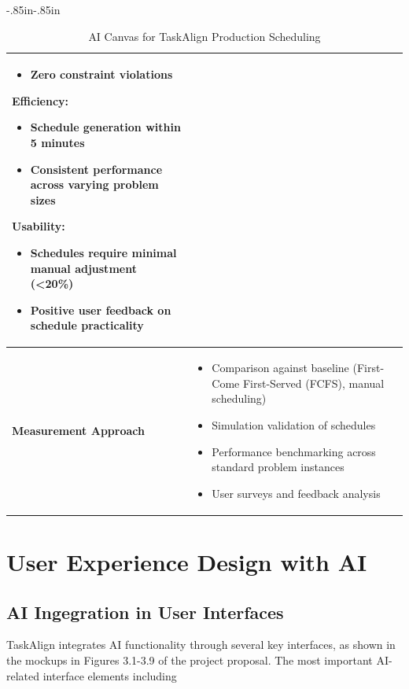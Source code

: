 \begin{table}[H]
\begin{adjustwidth}{-.85in}{-.85in}
\begin{tabularx}{1.3\textwidth}{|l|X|}
\begin{itemize}[nosep,leftmargin=*,topsep=2pt, partopsep=0pt, itemsep=1pt]
            \item Zero constraint violations
        \end{itemize}
        \textbf{Efficiency:}
        \begin{itemize}[nosep,leftmargin=*,topsep=2pt, partopsep=0pt, itemsep=1pt]
            \item Schedule generation within 5 minutes
            \item Consistent performance across varying problem sizes
        \end{itemize}
        \textbf{Usability:}
        \begin{itemize}[nosep,leftmargin=*,topsep=2pt, partopsep=0pt, itemsep=1pt]
            \item Schedules require minimal manual adjustment (<20\%)
            \item Positive user feedback on schedule practicality
        \end{itemize} \\
        \hline
        \textbf{Measurement Approach} &
        \begin{itemize}[nosep,leftmargin=*,topsep=2pt, partopsep=0pt, itemsep=1pt]
            \item Comparison against baseline (First-Come First-Served (FCFS), manual scheduling)
            \item Simulation validation of schedules
            \item Performance benchmarking across standard problem instances
            \item User surveys and feedback analysis
        \end{itemize} \\
        \hline
    \end{tabularx}
    \end{adjustwidth}
    \caption{AI Canvas for TaskAlign Production Scheduling}
\end{table}

\section{User Experience Design with AI}
\label{section:progress-tracking-report}

\subsection{AI Ingegration in User Interfaces}
TaskAlign integrates AI functionality through several key interfaces, as shown in the mockups in Figures 3.1-3.9 of the project proposal. The most important AI-related interface elements including

